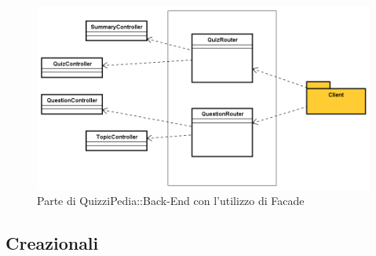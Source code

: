 \begin{itemize}
\begin{itemize}
		\label{Parte di QuizziPedia::Back-End con l' utilizzo di Facade}
		\begin{figure} [ht]
			\centering
			\includegraphics[scale=0.50]{UML/strutturaPattern/FacadeUtilizzo.png}
			\caption{Parte di QuizziPedia::Back-End con l'utilizzo di Facade}
		\end{figure}\FloatBarrier	 
	\end{itemize}

\end{itemize}

\subsection{Creazionali}

